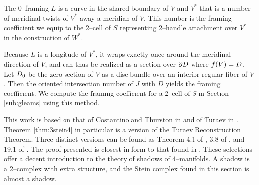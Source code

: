 The 0--framing $L$ is a curve in the shared boundary of $V$ and $V^*$ that is a number of meridinal twists of $V^*$ away a meridian of $V$.
This number is the framing coefficient we equip to the 2--cell of $S$ representing 2--handle attachment over $V^*$ in the construction of $W^*$.

Because $L$ is a longitude of $V^*$, it wraps exactly once around the meridinal direction of $V$, and can thus be realized as a section over $\partial D$ where $f(V)=D$.
Let $D_0$ be the zero section of $V$ as a disc bundle over an interior regular fiber of $V$.
Then the oriented intersection number of $J$ with $D$ yields the framing coefficient.
We compute the framing coefficient for a 2--cell of $S$ in Section \ref{sub:gleams} using this method.


This work is based on that of Costantino and Thurston in \cite{CostThur08} and of Turaev in \cite{Turaev91}.
Theorem \ref{thm:3stein4} in particular is a version of the Turaev Reconstruction Theorem.
Three distinct versions can be found as Theorem 4.1 of \cite{Cost05}, 3.8 of \cite{CostThur08}, and 19.1 of \cite{Turaev91}.
The proof presented is closest in form to that found in \cite{Cost05}.
These selections offer a decent introduction to the theory of shadows of 4--manifolds.
A shadow is a 2--complex with extra structure, and the Stein complex found in this section is almost a shadow.